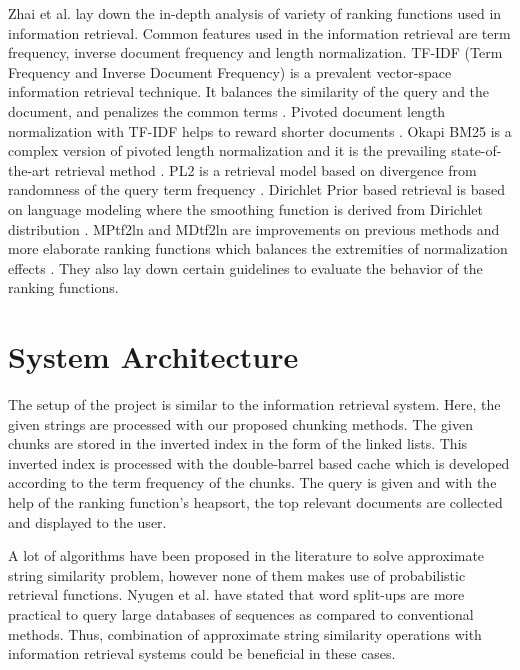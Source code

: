 Zhai et al. \cite{zhai2016text} lay down the in-depth analysis of variety of ranking functions used in information retrieval. Common features used in the information retrieval are term frequency, inverse document frequency and length normalization. TF-IDF (Term Frequency and Inverse Document Frequency) is a prevalent vector-space information retrieval technique. It balances the similarity of the query and the document, and penalizes the common terms \cite{tfidf}. Pivoted document length normalization with TF-IDF helps to reward shorter documents \cite{pl}. Okapi BM25 is a complex version of pivoted length normalization and it is the prevailing state-of-the-art retrieval method \cite{bm25}. PL2 is a retrieval model based on divergence from randomness of the query term frequency \cite{PL2}. Dirichlet Prior based retrieval is based on language modeling  where the smoothing function is derived from Dirichlet distribution \cite{dirich}. MPtf2ln and MDtf2ln are improvements on previous methods and more elaborate ranking functions which balances the extremities of normalization effects \cite{Fang}. They also lay down certain guidelines to evaluate the behavior of the ranking functions.

\section{System Architecture}

The setup of the project is similar to the information retrieval system.
Here, the given strings are processed with our proposed chunking methods.
The given chunks are stored in the inverted index in the form of the linked lists.
This inverted index is processed with the double-barrel based cache which is developed according to the term frequency of the chunks.
The query is given and with the help of the ranking function's heapsort, the top relevant documents are collected and displayed to the user.


A lot of algorithms have been proposed in the literature to solve approximate string similarity problem, however none of them makes use of probabilistic retrieval functions.
Nyugen et al. \cite{nguyen2016multiple} have stated that word split-ups are more practical to query large databases of sequences as compared to conventional methods. 
Thus, combination of approximate string similarity operations with information retrieval systems could be beneficial in these cases.
